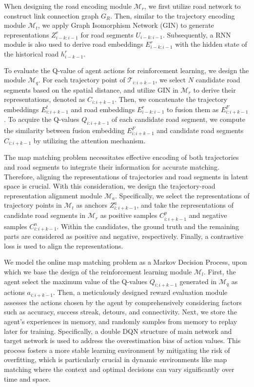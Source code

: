 When designing the road encoding module $\mathcal{M}_r$, we first utilize road network to construct link connection graph $G_R$. Then, similar to the trajectory encoding module $\mathcal{M}_t$, we apply Graph Isomorphism Network (GIN) to generate representations $Z_{i-k:i-1}^r$ for road segments $U_{i-k:i-1}$. Subsequently, a RNN module is also used to derive road embeddings $E_{i-k:i-1}^r$ with the hidden state of the historical road $h_{i-k-1}^r$.

To evaluate the Q-value of agent actions for reinforcement learning, we design the module $\mathcal{M}_q$. For each trajectory point of $\mathcal{T}_{i:i+k-1}$, we select $N$ candidate road segments based on the spatial distance, and utilize GIN in $\mathcal{M}_r$ to derive their representations, denoted as $C_{i:i+k-1}$. Then, we concatenate the trajectory embeddings $E_{i:i+k-1}^t$ and road embeddings $E_{i-k:i-1}^r$ to fusion them as $E_{i:i+k-1}^F$. To acquire the Q-values $Q_{i:i+k-1}$ of each candidate road segment, we compute the similarity between fusion embedding $E_{i:i+k-1}^F$ and candidate road segments $C_{i:i+k-1}$ by utilizing the attention mechanism.

The map matching problem necessitates effective encoding of both trajectories and road segments to integrate their information for accurate matching. Therefore, aligning the representations of trajectories and road segments in latent space is crucial. With this consideration, we design the trajectory-road representation alignment module $\mathcal{M}_a$. Specifically, we select the representations of trajectory points in $\mathcal{M}_t$ as anchors $Z_{i:i+k-1}^a$, and take the representations of candidate road segments in $\mathcal{M}_r$ as positive samples $C_{i:i+k-1}^p$ and negative samples $C_{i:i+k-1}^n$. Within the candidates, the ground truth and the remaining parts are considered as positive and negative, respectively. Finally, a contrastive loss is used to align the representations.

We model the online map matching problem as a Markov Decision Process, upon which we base the design of the reinforcement learning module $\mathcal{M}_l$. First, the agent select the maximum value of the Q-values $Q_{i:i+k-1}$ generated in $\mathcal{M}_q$ as actions $a_{i:i+k-1}$. Then, a meticulously designed reward evaluation module assesses the actions chosen by the agent by comprehensively considering factors such as accuracy, success streak, detours, and connectivity. Next, we store the agent's experiences in memory, and randomly samples from memory to replay later for training. Specifically, a double DQN structure of main network and target network is used to address the overestimation bias of action values. This process fosters a more stable learning environment by mitigating the risk of overfitting, which is particularly crucial in dynamic environments like map matching where the context and optimal decisions can vary significantly over time and space.
\fi
